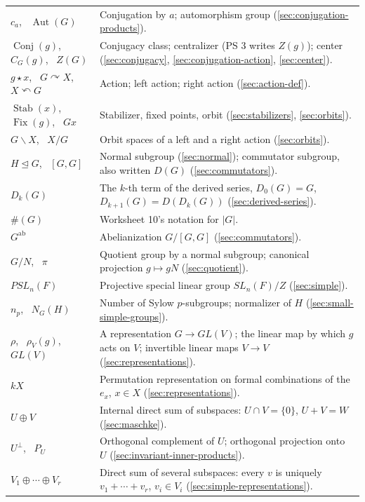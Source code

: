\documentclass[11pt]{report}
\begin{document}
{\begin{longtable}{p{4.2cm}p{10.3cm}}
$c_a$, \ $\operatorname{Aut}(G)$ & Conjugation by $a$; automorphism group (\ref{sec:conjugation-products}). \\
$\operatorname{Conj}(g)$, \ $C_G(g)$, \ $Z(G)$ & Conjugacy class; centralizer (PS 3 writes $Z(g)$); center (\ref{sec:conjugacy}, \ref{sec:conjugation-action}, \ref{sec:center}). \\
$g \star x$, \ $G \curvearrowright X$, \ $X \curvearrowleft G$ & Action; left action; right action (\ref{sec:action-def}). \\
$\operatorname{Stab}(x)$, \ $\operatorname{Fix}(g)$, \ $Gx$ & Stabilizer, fixed points, orbit (\ref{sec:stabilizers}, \ref{sec:orbits}). \\
$G\backslash X$, \ $X/G$ & Orbit spaces of a left and a right action (\ref{sec:orbits}). \\
$H \trianglelefteq G$, \ $[G, G]$ & Normal subgroup (\ref{sec:normal}); commutator subgroup, also written $D(G)$ (\ref{sec:commutators}). \\
$D_k(G)$ & The $k$-th term of the derived series, $D_0(G) = G$, $D_{k+1}(G) = D(D_k(G))$ (\ref{sec:derived-series}). \\
$\#(G)$ & Worksheet 10's notation for $|G|$. \\
$G^{\mathrm{ab}}$ & Abelianization $G/[G,G]$ (\ref{sec:commutators}). \\
$G/N$, \ $\pi$ & Quotient group by a normal subgroup; canonical projection $g \mapsto gN$ (\ref{sec:quotient}). \\
$PSL_n(F)$ & Projective special linear group $SL_n(F)/Z$ (\ref{sec:simple}). \\
$n_p$, \ $N_G(H)$ & Number of Sylow $p$-subgroups; normalizer of $H$ (\ref{sec:small-simple-groups}). \\
$\rho$, \ $\rho_V(g)$, \ $GL(V)$ & A representation $G \to GL(V)$; the linear map by which $g$ acts on $V$; invertible linear maps $V \to V$ (\ref{sec:representations}). \\
$kX$ & Permutation representation on formal combinations of the $e_x$, $x \in X$ (\ref{sec:representations}). \\
$U \oplus V$ & Internal direct sum of subspaces: $U \cap V = \{0\}$, $U + V = W$ (\ref{sec:maschke}). \\
$U^\perp$, \ $P_U$ & Orthogonal complement of $U$; orthogonal projection onto $U$ (\ref{sec:invariant-inner-products}). \\
$V_1 \oplus \cdots \oplus V_r$ & Direct sum of several subspaces: every $v$ is uniquely $v_1 + \cdots + v_r$, $v_i \in V_i$ (\ref{sec:simple-representations}). \\

\end{longtable}}
\end{document}
